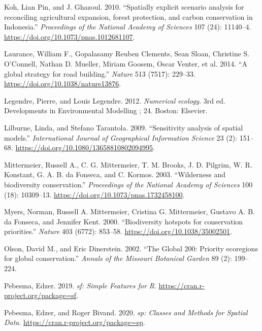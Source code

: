 \documentclass[
]{article}
\begin{document}
\leavevmode\hypertarget{ref-Koh2010a}{}%
Koh, Lian Pin, and J. Ghazoul. 2010. ``Spatially explicit scenario analysis for reconciling agricultural expansion, forest protection, and carbon conservation in Indonesia.'' \emph{Proceedings of the National Academy of Sciences} 107 (24): 11140--4. \url{https://doi.org/10.1073/pnas.1012681107}.

\leavevmode\hypertarget{ref-Laurance2014a}{}%
Laurance, William F., Gopalasamy Reuben Clements, Sean Sloan, Christine S. O'Connell, Nathan D. Mueller, Miriam Goosem, Oscar Venter, et al. 2014. ``A global strategy for road building.'' \emph{Nature} 513 (7517): 229--33. \url{https://doi.org/10.1038/nature13876}.

\leavevmode\hypertarget{ref-Legendre2012}{}%
Legendre, Pierre, and Louis Legendre. 2012. \emph{Numerical ecology}. 3rd ed. Developments in Environmental Modelling ; 24. Boston: Elsevier.

\leavevmode\hypertarget{ref-Lilburne2009}{}%
Lilburne, Linda, and Stefano Tarantola. 2009. ``Sensitivity analysis of spatial models.'' \emph{International Journal of Geographical Information Science} 23 (2): 151--68. \url{https://doi.org/10.1080/13658810802094995}.

\leavevmode\hypertarget{ref-Mittermeier2003}{}%
Mittermeier, Russell A., C. G. Mittermeier, T. M. Brooks, J. D. Pilgrim, W. R. Konstant, G. A. B. da Fonseca, and C. Kormos. 2003. ``Wilderness and biodiversity conservation.'' \emph{Proceedings of the National Academy of Sciences} 100 (18): 10309--13. \url{https://doi.org/10.1073/pnas.1732458100}.

\leavevmode\hypertarget{ref-Myers2000}{}%
Myers, Norman, Russell A. Mittermeier, Cristina G. Mittermeier, Gustavo A. B. da Fonseca, and Jennifer Kent. 2000. ``Biodiversity hotspots for conservation priorities.'' \emph{Nature} 403 (6772): 853--58. \url{https://doi.org/10.1038/35002501}.

\leavevmode\hypertarget{ref-Olson2002}{}%
Olson, David M., and Eric Dinerstein. 2002. ``The Global 200: Priority ecoregions for global conservation.'' \emph{Annals of the Missouri Botanical Garden} 89 (2): 199--224.

\leavevmode\hypertarget{ref-R-sf}{}%
Pebesma, Edzer. 2019. \emph{sf: Simple Features for R}. \url{https://cran.r-project.org/package=sf}.

\leavevmode\hypertarget{ref-R-sp}{}%
Pebesma, Edzer, and Roger Bivand. 2020. \emph{sp: Classes and Methods for Spatial Data}. \url{https://cran.r-project.org/package=sp}.
\end{document}
